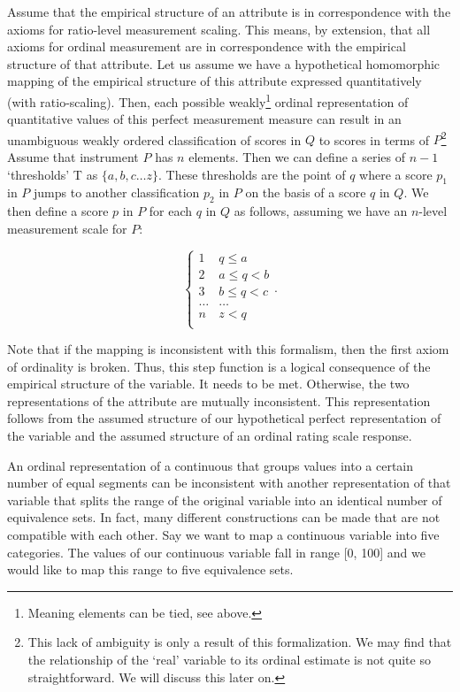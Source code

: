 \documentclass[utf8]{FrontiersinVancouver}
\begin{document}
Assume that the empirical structure of an attribute is in correspondence with the axioms for ratio-level measurement scaling. This means, by extension, that all axioms for ordinal measurement are in correspondence with the empirical structure of that attribute. Let us assume we have a hypothetical homomorphic mapping of the empirical structure of this attribute expressed quantitatively (with ratio-scaling). Then, each possible weakly\footnote{Meaning elements can be tied, see above.} ordinal representation of quantitative values of this perfect measurement measure can result in an unambiguous weakly ordered classification of scores in $Q$ to scores in terms of $P$\footnote{This lack of ambiguity is only a result of this formalization. We may find that the relationship of the `real' variable to its ordinal estimate is not quite so straightforward. We will discuss this later on.} Assume that instrument $P$ has $n$ elements. Then we can define a series of $n - 1$ `thresholds' T as $\{ a, b, c \ldots z \}$. These thresholds are the point of $q$ where a score $p_1$ in $P$ jumps to another classification $p_2$ in $P$ on the basis of a score $q$ in $Q$. We then define a score $p$ in $P$ for each $q$ in $Q$ as follows, assuming we have an $n$-level measurement scale for $P$:

\[
\begin{cases} 
    1 & q \leq a\\
    2 & a \leq q < b\\
    3 & b \leq q < c\\
    \ldots & \ldots\\    
    n & z < q\\
\end{cases}.
\]

Note that if the mapping is inconsistent with this formalism, then the first axiom of ordinality is broken. Thus, this step function is a logical consequence of the empirical structure of the variable. It needs to be met. Otherwise, the two representations of the attribute are mutually inconsistent. This representation follows from the assumed structure of our hypothetical perfect representation of the variable and the assumed structure of an ordinal rating scale response. 

An ordinal representation of a continuous that groups values into a certain number of equal segments can be inconsistent with another representation of that variable that splits the range of the original variable into an identical number of equivalence sets. In fact, many different constructions can be made that are not compatible with each other. Say we want to map a continuous variable into five categories. The values of our continuous variable fall in range [0, 100] and we would like to map this range to five equivalence sets.
\end{document}
